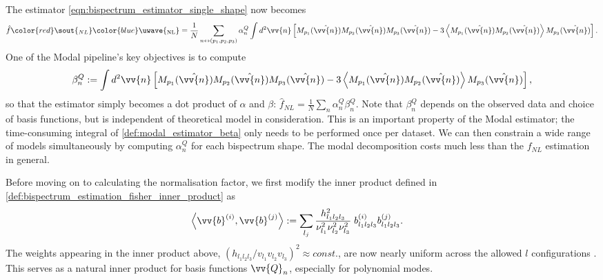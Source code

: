 \documentclass[a4paper,12pt,times,custombib,print,index]{Classes/PhDThesisPSnPDF} %
\providecommand{\DIFadd}[1]{{\protect\color{blue}\uwave{#1}}} %
\providecommand{\DIFdel}[1]{{\protect\color{red}\sout{#1}}}                      %
\providecommand{\DIFaddbegin}{} %
\providecommand{\DIFaddend}{} %
\providecommand{\DIFdelbegin}{} %
\providecommand{\DIFdelend}{} %
\newcommand{\DIFscaledelfig}{0.5}
\newlength{\DIFdelgraphicswidth} %
\newlength{\DIFdelgraphicsheight} %
\newcommand{\DIFaddincludegraphics}[2][]{{\color{blue}\fbox{\DIFOincludegraphics[#1]{#2}}}} %
\newcommand{\DIFdelincludegraphics}[2][]{%
\sbox{\DIFdelgraphicsbox}{\DIFOincludegraphics[#1]{#2}}%
\settoboxwidth{\DIFdelgraphicswidth}{\DIFdelgraphicsbox} %
\settoboxtotalheight{\DIFdelgraphicsheight}{\DIFdelgraphicsbox} %
\scalebox{\DIFscaledelfig}{%
\parbox[b]{\DIFdelgraphicswidth}{\usebox{\DIFdelgraphicsbox}\\[-\baselineskip] \rule{\DIFdelgraphicswidth}{0em}}\llap{\resizebox{\DIFdelgraphicswidth}{\DIFdelgraphicsheight}{%
\setlength{\unitlength}{\DIFdelgraphicswidth}%
\begin{picture}(1,1)%
\thicklines\linethickness{2pt} %
{\color[rgb]{1,0,0}\put(0,0){\framebox(1,1){}}}%
{\color[rgb]{1,0,0}\put(0,0){\line( 1,1){1}}}%
{\color[rgb]{1,0,0}\put(0,1){\line(1,-1){1}}}%
\end{picture}%
}\hspace*{3pt}}} %
} %
\DeclareRobustCommand{\DIFaddbegin}{\DIFOaddbegin \let\includegraphics\DIFaddincludegraphics} %
\DeclareRobustCommand{\DIFaddend}{\DIFOaddend \let\includegraphics\DIFOincludegraphics} %
\DeclareRobustCommand{\DIFdelbegin}{\DIFOdelbegin \let\includegraphics\DIFdelincludegraphics} %
\DeclareRobustCommand{\DIFdelend}{\DIFOaddend \let\includegraphics\DIFOincludegraphics} %
\begin{document}
The estimator \eqref{eqn:bispectrum_estimator_single_shape} now becomes
\begin{align}
	\hat{f}\DIFdelbegin \DIFdel{_{NL} }\DIFdelend \DIFaddbegin \DIFadd{_\text{NL} }\DIFaddend = \frac{1}{N} \sum_{n \newline \leftrightarrow (p_1,p_2,p_3)} \alpha_n^Q \int d^2 \vv{n} \left[ M_{p_1}(\hat{\vv{n}}) M_{p_2}(\hat{\vv{n}}) M_{p_3}(\hat{\vv{n}}) - 3 \left< M_{p_1}(\hat{\vv{n}}) M_{p_2}(\hat{\vv{n}}) \right> M_{p_3}(\hat{\vv{n}})  \right].
\end{align}
One of the Modal pipeline's key objectives is to compute
\begin{align}
	\beta^Q_n := \int d^2 \vv{n} \left[ M_{p_1}(\hat{\vv{n}}) M_{p_2}(\hat{\vv{n}}) M_{p_3}(\hat{\vv{n}}) - 3 \left< M_{p_1}(\hat{\vv{n}}) M_{p_2}(\hat{\vv{n}}) \right> M_{p_3}(\hat{\vv{n}})  \right], \label{def:modal_estimator_beta}
\end{align}
so that the estimator simply becomes a dot product of $\alpha$ and $\beta$: \DIFdelbegin \DIFdel{$\hat{f}_{NL} = \frac{1}{N} \sum_n \alpha^Q_n \beta^Q_n$}\DIFdelend \DIFaddbegin \DIFadd{$\hat{f}_\text{NL} = \frac{1}{N} \sum_n \alpha^Q_n \beta^Q_n$}\DIFaddend . Note that $\beta_n^Q$ depends on the observed data and choice of basis functions, but is independent of theoretical model in consideration. This is an important property of the Modal estimator; the time-consuming integral of \eqref{def:modal_estimator_beta} only needs to be performed once per dataset. We can then constrain a wide range of models simultaneously by computing $\alpha^Q_n$ for each bispectrum shape. The modal decomposition costs much less than the \DIFdelbegin \DIFdel{$f_{NL}$ }\DIFdelend \DIFaddbegin \DIFadd{$f_\text{NL}$ }\DIFaddend estimation in general.

Before moving on to calculating the normalisation factor, we first modify the inner product defined in \eqref{def:bispectrum_estimation_fisher_inner_product} as
\begin{align}
	\left< \vv{b}^{(i)}, \vv{b}^{(j)} \right> &:= \sum_{l_j} \frac{h^2_{l_1 l_2 l_3}}{\nu_{l_1}^2 \nu_{l_2}^2 \nu_{l_3}^2 } \; b^{(i)}_{l_1 l_2 l_3} b^{(j)}_{l_1 l_2 l_3}.
\end{align}
The weights appearing in the inner product above, $(h_{l_1 l_2 l_3}/v_{l_1} v_{l_2} v_{l_3})^2\approx const.$, are now nearly uniform across the allowed $l$ configurations \cite{Fergusson2010general}. This serves as a natural inner product for basis functions $\vv{Q}_n$, especially for polynomial modes.
\end{document}
